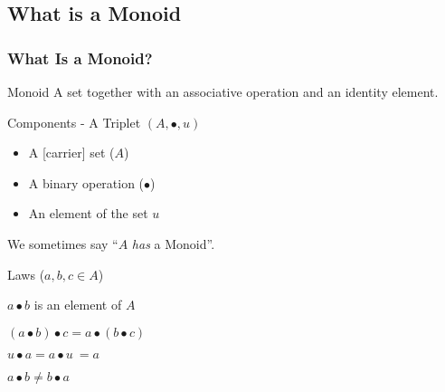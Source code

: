\documentclass{beamer}
\begin{document}
\subsection{What is a Monoid}

\begin{frame}
  \frametitle{What Is a Monoid?}
  \begin{block}{Monoid}
    A \alert{set} together with an \alert{associative} \alert{operation}
    and an \alert{identity} element.
  \end{block}

  \pause

  \begin{block}{Components - A Triplet \((A, \bullet, u)\)}
  \begin{itemize}
    \item A [carrier] set (\(A\))
    \item A binary operation (\(\bullet\))
    \item An element of the set \(u\)
  \end{itemize}
  We sometimes say ``\(A\) \emph{has} a Monoid''.
  \end{block}

  \pause
  \begin{block}{Laws (\(a,b,c \in A\))}

  \begin{description}[Commutativity:]
    \item[Closure:] \(a \bullet b\) is an element of \(A\)
    \item[Associativity:] \((a \bullet b) \bullet c = a \bullet (b \bullet c)\)
    \item[Identity:] \(u \bullet a = a \bullet u \ = a\)
    \item[\sout{Commutativity:}] \(a \bullet b \neq b \bullet a\)
  \end{description}
  \end{block}
\end{frame}
\end{document}
